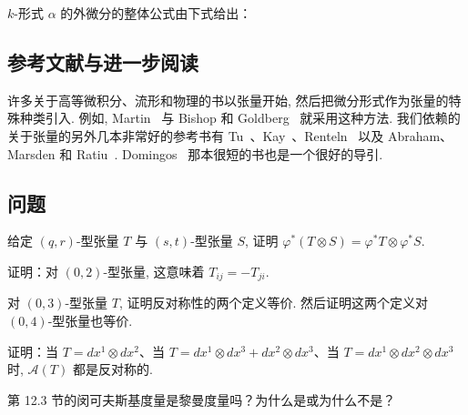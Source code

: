 $k$-形式 $\alpha$ 的外微分的整体公式由下式给出：
\begin{center}
\end{center}

\subsection{参考文献与进一步阅读}

许多关于高等微积分、流形和物理的书以张量开始, 然后把微分形式作为张量的特殊种类引入. 例如, Martin~\cite{ref33} 与 Bishop 和 Goldberg~\cite{ref06} 就采用这种方法. 我们依赖的关于张量的另外几本非常好的参考书有 Tu~\cite{ref46}、Kay~\cite{ref29}、Renteln~\cite{ref37} 以及 Abraham、Marsden 和 Ratiu~\cite{ref01}. Domingos~\cite{ref15} 那本很短的书也是一个很好的导引.

\subsection{问题}

\begin{question}\label{q:A-1}
给定 $(q,r)$-型张量 $T$ 与 $(s,t)$-型张量 $S$, 证明 $\varphi^*\left(T\otimes S\right)=\varphi^*T\otimes\varphi^*S$.
\end{question}

\begin{question}\label{q:A-2}
证明：对 $(0,2)$-型张量, 这意味着 $T_{ij}=-T_{ji}$.
\end{question}

\begin{question}\label{q:A-3}
对 $(0,3)$-型张量 $T$, 证明反对称性的两个定义等价. 然后证明这两个定义对 $(0,4)$-型张量也等价.
\end{question}

\begin{question}\label{q:A-4}
证明：当 $T=dx^1\otimes dx^2$、当 $T=dx^1\otimes dx^3+dx^2\otimes dx^3$、当 $T=dx^1\otimes dx^2\otimes dx^3$ 时, $\mathcal{A}(T)$ 都是反对称的.
\end{question}

\begin{question}\label{q:A-5}
第 12.3 节的闵可夫斯基度量是黎曼度量吗？为什么是或为什么不是？
\end{question}

